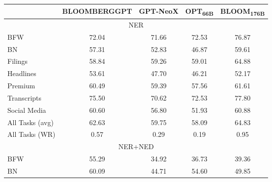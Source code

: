 \begin{table}[h!]
	\centering
	\begin{tabularx}{\textwidth}{Xcccc}
		\toprule
		                & \textbf{BLOOMBERGGPT} & \textbf{GPT-NeoX} & \textbf{OPT\textsubscript{66B}} & \textbf{BLOOM\textsubscript{176B}} \\
		\midrule
		\multicolumn{5}{c}{NER}                                                                                                            \\
		\midrule
		BFW             & 72.04                 & 71.66             & 72.53                           & 76.87                              \\
		BN              & 57.31                 & 52.83             & 46.87                           & 59.61                              \\
		Filings         & 58.84                 & 59.26             & 59.01                           & 64.88                              \\
		Headlines       & 53.61                 & 47.70             & 46.21                           & 52.17                              \\
		Premium         & 60.49                 & 59.39             & 57.56                           & 61.61                              \\
		Transcripts     & 75.50                 & 70.62             & 72.53                           & 77.80                              \\
		Social Media    & 60.60                 & 56.80             & 51.93                           & 60.88                              \\
		\midrule
		All Tasks (avg) & 62.63                 & 59.75             & 58.09                           & 64.83                              \\
		All Tasks (WR)  & 0.57                  & 0.29              & 0.19                            & 0.95                               \\
		\midrule
		\multicolumn{5}{c}{NER+NED}                                                                                                        \\
		\midrule
		BFW             & 55.29                 & 34.92             & 36.73                           & 39.36                              \\
		BN              & 60.09                 & 44.71             & 54.60                           & 49.85                              \\

\end{tabularx}
\end{table}

